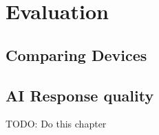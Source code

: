 \chapter{Evaluation}
\label{cha:evaluation}
\section{Comparing Devices}
\section{AI Response quality}



TODO: Do this chapter
